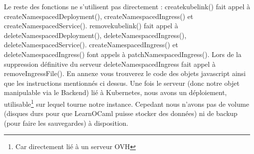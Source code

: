 \documentclass{article}
\begin{document}
\newline
Le reste des fonctions ne s'utilisent pas directement :
\newline
createkubelink() fait appel à createNamespacedDeployment(), createNamespacedIngress() et createNamespacedService().
\newline
removekubelink() fait appel à deleteNamespacedDeployment(), deleteNamespacedIngress(), deleteNamespacedService().
\newline
createNamespacedIngress() et deleteNamespacedIngress() font appels à patchNamespacedIngress().
\newline
Lors de la suppression définitive du serveur deleteNamespacedIngress fait appel à removeIngressFile().
\newline
\newline
En annexe vous trouverez le code des objets javascript ainsi que les instructions mentionnés ci dessus.
\newline
\newline
Une fois le serveur (donc notre objet manipulable via le Backend) lié à Kubernetes, nous avons un déploiement, utilisable\footnote{Car directement lié à un serveur OVH} sur lequel tourne notre instance. Cepedant nous n'avons pas de volume (disques durs pour que LearnOCaml puisse stocker des données) ni de backup (pour faire les sauvegardes) à disposition.

\newpage
\end{document}
